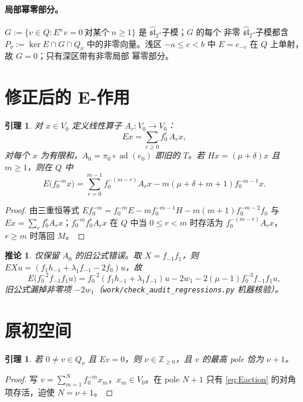 \documentclass[11pt]{article}
\newcommand{\Z}{\mathbb Z}
\newcommand{\g}{\widehat{\mathfrak{sl}}_2}
\newcommand{\ad}{\operatorname{ad}}
\newtheorem{lemma}[theorem]{引理}
\newtheorem{corollary}[theorem]{推论}
\begin{document}
\paragraph{局部幂零部分。}
$G:=\{v\in Q:E^nv=0\ \text{对某个}\ n\ge1\}$ 是 $\g$-子模；$G$ 的每个
非零 $\g$-子模都含 $P_\nu:=\ker E\cap G\cap Q_\nu$ 中的非零向量。浅区
$-a\le c<b$ 中 $E=e_{-c}$ 在 $Q$ 上单射，故 $G=0$；只有深区带有非零局部
幂零部分。

\section{修正后的 E-作用}

\begin{lemma}\label{lem:Eaction}
对 $x\in V_0$ 定义线性算子 $A_r:V_0\to V_0$：
\[
 Ex=\sum_{r\ge0}f_0^r\,A_rx,
\]
对每个 $x$ 为有限和，$A_0=\pi_0\circ\ad(e_0)$ 即旧的 $T$。若
$Hx=(\mu+\delta)x$ 且 $m\ge1$，则在 $Q$ 中
\begin{equation}\label{eq:Eaction}
 E\bigl(f_0^{-m}x\bigr)
 =\sum_{r=0}^{m-1}f_0^{-(m-r)}A_rx
 -m(\mu+\delta+m+1)f_0^{-m-1}x.
\end{equation}
\end{lemma}

\begin{proof}
由三重恒等式 $Ef_0^{-m}=f_0^{-m}E-mf_0^{-m-1}H-m(m+1)f_0^{-m-2}f_0$ 与
$Ex=\sum_rf_0^rA_rx$；$f_0^{-m}f_0^rA_rx$ 在 $Q$ 中当 $0\le r<m$ 时存活为
$f_0^{-(m-r)}A_rx$，$r\ge m$ 时落回 $M$。
\end{proof}

\begin{corollary}\label{cor:counterexample}
仅保留 $A_0$ 的旧公式错误。取 $X=f_{-1}f_1$，则
$EXu=(f_1h_{-1}+\lambda_1f_{-1}-2f_0)u$，故
\[
 E\bigl(f_0^{-2}f_{-1}f_1u\bigr)
 =f_0^{-2}(f_1h_{-1}+\lambda_1f_{-1})u
 -2w_1-2(\mu-1)f_0^{-3}f_{-1}f_1u,
\]
旧公式漏掉非零项 $-2w_1$（\texttt{work/check\_audit\_regressions.py}
机器核验）。
\end{corollary}

\section{原初空间}

\begin{lemma}\label{lem:pole}
若 $0\ne v\in Q_\nu$ 且 $Ev=0$，则 $\nu\in\Z_{\ge0}$，且 $v$ 的最高 pole
恰为 $\nu+1$。
\end{lemma}

\begin{proof}
写 $v=\sum_{m=1}^{N}f_0^{-m}x_m$，$x_m\in V_0$。在 pole $N+1$ 只有
\eqref{eq:Eaction} 的对角项存活，迫使 $N=\nu+1$。
\end{proof}
\end{document}
